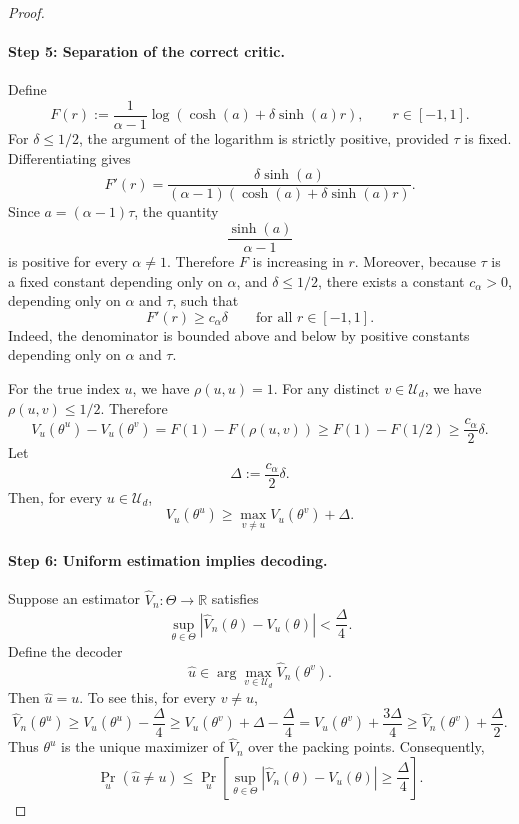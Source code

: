 \documentclass{article}
\theoremstyle{plain}
\theoremstyle{definition}
\theoremstyle{remark}
\begin{document}
\begin{proof}
\paragraph{Step 5: Separation of the correct critic.}
Define
\[
    F(r)
    :=
    \frac{1}{\alpha-1}
    \log\!\left(\cosh(a)+\delta\sinh(a)r\right),
    \qquad r\in[-1,1].
\]
For \(\delta\le 1/2\), the argument of the logarithm is strictly positive,
provided \(\tau\) is fixed. Differentiating gives
\[
    F'(r)
    =
    \frac{\delta\sinh(a)}
    {(\alpha-1)\left(\cosh(a)+\delta\sinh(a)r\right)}.
\]
Since \(a=(\alpha-1)\tau\), the quantity
\[
    \frac{\sinh(a)}{\alpha-1}
\]
is positive for every \(\alpha\ne 1\). Therefore \(F\) is increasing in \(r\).
Moreover, because \(\tau\) is a fixed constant depending only on \(\alpha\), and
\(\delta\le 1/2\), there exists a constant \(c_\alpha>0\), depending only on
\(\alpha\) and \(\tau\), such that
\[
    F'(r)\ge c_\alpha \delta
    \qquad\text{for all }r\in[-1,1].
\]
Indeed, the denominator is bounded above and below by positive constants
depending only on \(\alpha\) and \(\tau\).

For the true index \(u\), we have \(\rho(u,u)=1\). For any distinct
\(v\in\mathcal U_d\), we have \(\rho(u,v)\le 1/2\). Therefore
\[
    V_u(\theta^u)-V_u(\theta^v)
    =
    F(1)-F(\rho(u,v))
    \ge
    F(1)-F(1/2)
    \ge
    \frac{c_\alpha}{2}\delta.
\]
Let
\[
    \Delta:=\frac{c_\alpha}{2}\delta.
\]
Then, for every \(u\in\mathcal U_d\),
\[
    V_u(\theta^u)
    \ge
    \max_{v\ne u} V_u(\theta^v)+\Delta.
\]

\paragraph{Step 6: Uniform estimation implies decoding.}
Suppose an estimator \(\widehat V_n:\Theta\to\mathbb R\) satisfies
\[
    \sup_{\theta\in\Theta}
    |\widehat V_n(\theta)-V_u(\theta)|
    <
    \frac{\Delta}{4}.
\]
Define the decoder
\[
    \widehat u
    \in
    \arg\max_{v\in\mathcal U_d} \widehat V_n(\theta^v).
\]
Then \(\widehat u=u\). To see this, for every \(v\ne u\),
\[
    \widehat V_n(\theta^u)
    \ge
    V_u(\theta^u)-\frac{\Delta}{4}
    \ge
    V_u(\theta^v)+\Delta-\frac{\Delta}{4}
    =
    V_u(\theta^v)+\frac{3\Delta}{4}
    \ge
    \widehat V_n(\theta^v)+\frac{\Delta}{2}.
\]
Thus \(\theta^u\) is the unique maximizer of \(\widehat V_n\) over the packing
points. Consequently,
\[
    \Pr_u(\widehat u\ne u)
    \le
    \Pr_u\!\left[
        \sup_{\theta\in\Theta}
        |\widehat V_n(\theta)-V_u(\theta)|
        \ge
        \frac{\Delta}{4}
    \right].
\]


\end{proof}
\end{document}
